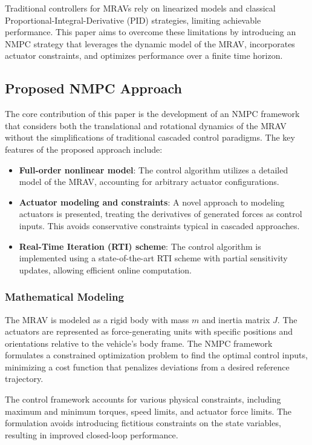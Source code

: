\documentclass[a4paper,12pt]{article}
\begin{document}
Traditional controllers for MRAVs rely on linearized models and classical Proportional-Integral-Derivative (PID) strategies, limiting achievable performance. This paper aims to overcome these limitations by introducing an NMPC strategy that leverages the dynamic model of the MRAV, incorporates actuator constraints, and optimizes performance over a finite time horizon.

\subsection{Proposed NMPC Approach}
The core contribution of this paper is the development of an NMPC framework that considers both the translational and rotational dynamics of the MRAV without the simplifications of traditional cascaded control paradigms. The key features of the proposed approach include:

\begin{itemize}
	\item \textbf{Full-order nonlinear model}: The control algorithm utilizes a detailed model of the MRAV, accounting for arbitrary actuator configurations.
	\item \textbf{Actuator modeling and constraints}: A novel approach to modeling actuators is presented, treating the derivatives of generated forces as control inputs. This avoids conservative constraints typical in cascaded approaches.
	\item \textbf{Real-Time Iteration (RTI) scheme}: The control algorithm is implemented using a state-of-the-art RTI scheme with partial sensitivity updates, allowing efficient online computation.
\end{itemize}

\subsubsection{Mathematical Modeling}
The MRAV is modeled as a rigid body with mass \( m \) and inertia matrix \( J \). The actuators are represented as force-generating units with specific positions and orientations relative to the vehicle's body frame. The NMPC framework formulates a constrained optimization problem to find the optimal control inputs, minimizing a cost function that penalizes deviations from a desired reference trajectory.

The control framework accounts for various physical constraints, including maximum and minimum torques, speed limits, and actuator force limits. The formulation avoids introducing fictitious constraints on the state variables, resulting in improved closed-loop performance.
\end{document}
